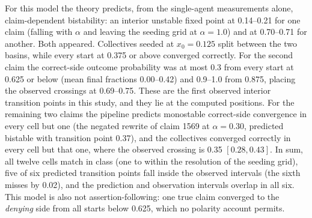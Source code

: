 \documentclass{ieeeaccess}
\begin{document}
For this model the theory predicts, from the single-agent measurements
alone, claim-dependent bistability: an interior unstable fixed point at
0.14--0.21 for one claim (falling with $\alpha$ and leaving the seeding
grid at $\alpha = 1.0$) and at 0.70--0.71 for another. Both appeared.
Collectives seeded at $x_0 = 0.125$ split between the two basins, while
every start at 0.375 or above converged correctly. For the second claim
the correct-side outcome probability was at most 0.3 from every start at
0.625 or below (mean final fractions 0.00--0.42) and 0.9--1.0 from 0.875,
placing the observed crossings at 0.69--0.75. These are the first observed
interior transition points in this study, and they lie at the computed
positions. For the remaining two claims the pipeline predicts monostable
correct-side convergence in every cell but one (the negated rewrite of
claim 1569 at $\alpha = 0.30$, predicted bistable with transition point
0.37), and the collectives converged correctly in every cell but that one,
where the observed crossing is 0.35 $[0.28, 0.43]$. In sum, all twelve
cells match in class (one to within the resolution of the seeding grid),
five of six predicted transition points fall inside the observed intervals
(the sixth misses by 0.02), and the prediction and observation intervals
overlap in all six. This model is also not assertion-following: one true
claim converged to the \emph{denying} side from all starts below 0.625,
which no polarity account permits.
\end{document}
